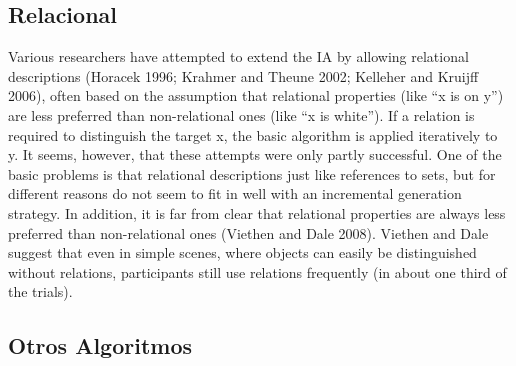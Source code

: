 \subsection{Relacional}

Various researchers have attempted to extend the IA by allowing relational descriptions
(Horacek 1996; Krahmer and Theune 2002; Kelleher and Kruijff 2006), often based
on the assumption that relational properties (like ``x is on y'') are less preferred than
non-relational ones (like ``x is white''). If a relation is required to distinguish the target
x, the basic algorithm is applied iteratively to y. It seems, however, that these attempts
were only partly successful. One of the basic problems is that relational descriptions
just like references to sets, but for different reasons do not seem to fit in well with an
incremental generation strategy. In addition, it is far from clear that relational properties
are always less preferred than non-relational ones (Viethen and Dale 2008). Viethen
and Dale suggest that even in simple scenes, where objects can easily be distinguished
without relations, participants still use relations frequently (in about one third of the
trials).

\subsection{Otros Algoritmos}

